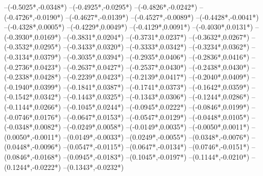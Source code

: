 {	--({-0.5025*\xskala},{-0.0348*\yskala})
	--({-0.4925*\xskala},{-0.0295*\yskala})
	--({-0.4826*\xskala},{-0.0242*\yskala})
	--({-0.4726*\xskala},{-0.0190*\yskala})
	--({-0.4627*\xskala},{-0.0139*\yskala})
	--({-0.4527*\xskala},{-0.0089*\yskala})
	--({-0.4428*\xskala},{-0.0041*\yskala})
	--({-0.4328*\xskala},{0.0005*\yskala})
	--({-0.4229*\xskala},{0.0049*\yskala})
	--({-0.4129*\xskala},{0.0091*\yskala})
	--({-0.4030*\xskala},{0.0131*\yskala})
	--({-0.3930*\xskala},{0.0169*\yskala})
	--({-0.3831*\xskala},{0.0204*\yskala})
	--({-0.3731*\xskala},{0.0237*\yskala})
	--({-0.3632*\xskala},{0.0267*\yskala})
	--({-0.3532*\xskala},{0.0295*\yskala})
	--({-0.3433*\xskala},{0.0320*\yskala})
	--({-0.3333*\xskala},{0.0342*\yskala})
	--({-0.3234*\xskala},{0.0362*\yskala})
	--({-0.3134*\xskala},{0.0379*\yskala})
	--({-0.3035*\xskala},{0.0394*\yskala})
	--({-0.2935*\xskala},{0.0406*\yskala})
	--({-0.2836*\xskala},{0.0416*\yskala})
	--({-0.2736*\xskala},{0.0423*\yskala})
	--({-0.2637*\xskala},{0.0427*\yskala})
	--({-0.2537*\xskala},{0.0430*\yskala})
	--({-0.2438*\xskala},{0.0430*\yskala})
	--({-0.2338*\xskala},{0.0428*\yskala})
	--({-0.2239*\xskala},{0.0423*\yskala})
	--({-0.2139*\xskala},{0.0417*\yskala})
	--({-0.2040*\xskala},{0.0409*\yskala})
	--({-0.1940*\xskala},{0.0399*\yskala})
	--({-0.1841*\xskala},{0.0387*\yskala})
	--({-0.1741*\xskala},{0.0373*\yskala})
	--({-0.1642*\xskala},{0.0359*\yskala})
	--({-0.1542*\xskala},{0.0342*\yskala})
	--({-0.1443*\xskala},{0.0325*\yskala})
	--({-0.1343*\xskala},{0.0306*\yskala})
	--({-0.1244*\xskala},{0.0286*\yskala})
	--({-0.1144*\xskala},{0.0266*\yskala})
	--({-0.1045*\xskala},{0.0244*\yskala})
	--({-0.0945*\xskala},{0.0222*\yskala})
	--({-0.0846*\xskala},{0.0199*\yskala})
	--({-0.0746*\xskala},{0.0176*\yskala})
	--({-0.0647*\xskala},{0.0153*\yskala})
	--({-0.0547*\xskala},{0.0129*\yskala})
	--({-0.0448*\xskala},{0.0105*\yskala})
	--({-0.0348*\xskala},{0.0082*\yskala})
	--({-0.0249*\xskala},{0.0058*\yskala})
	--({-0.0149*\xskala},{0.0035*\yskala})
	--({-0.0050*\xskala},{0.0011*\yskala})
	--({0.0050*\xskala},{-0.0011*\yskala})
	--({0.0149*\xskala},{-0.0033*\yskala})
	--({0.0249*\xskala},{-0.0055*\yskala})
	--({0.0348*\xskala},{-0.0076*\yskala})
	--({0.0448*\xskala},{-0.0096*\yskala})
	--({0.0547*\xskala},{-0.0115*\yskala})
	--({0.0647*\xskala},{-0.0134*\yskala})
	--({0.0746*\xskala},{-0.0151*\yskala})
	--({0.0846*\xskala},{-0.0168*\yskala})
	--({0.0945*\xskala},{-0.0183*\yskala})
	--({0.1045*\xskala},{-0.0197*\yskala})
	--({0.1144*\xskala},{-0.0210*\yskala})
	--({0.1244*\xskala},{-0.0222*\yskala})
	--({0.1343*\xskala},{-0.0232*\yskala})
}
